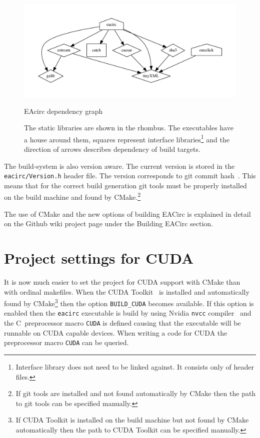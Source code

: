 \documentclass[12pt,twoside]{fithesis2}
\begin{document}
\begin{figure}[h]
	\begin{center}
		\includegraphics[width=.8\textwidth]{figures/deps}
	\end{center}
	\caption{EAcirc dependency graph}
	\label{fig:deps}
	\caption*{The static libraries are shown in the rhombus. The executables have a house around them, squares represent interface libraries\footnote{Interface library does not need to be linked against. It consists only of header files.} and the direction of arrows describes dependency of build targets.}
\end{figure}

The build-system is also version aware. The current version is stored in the \texttt{eacirc/Version.h} header file. The version corresponds to git commit hash~\cite{git_book}. This means that for the correct build generation git tools must be properly installed on the build machine and found by CMake.\footnote{If git tools are installed and not found automatically by CMake then the path to git tools can be specified manually.}

The use of CMake and the new options of building EACirc is explained in detail on the Github wiki project page under the Building EACirc section.

\section{Project settings for CUDA}

It is now much easier to set the project for CUDA support with CMake than with ordinal makefiles. When the CUDA Toolkit~\cite{cuda_toolkit} is installed and automatically found by CMake\footnote{If CUDA Toolkit is installed on the build machine but not found by CMake automatically then the path to CUDA Toolkit can be specified manually.} then the option \texttt{BUILD\_CUDA} becomes available. If this option is enabled then the \texttt{eacirc} executable is build by using Nvidia \texttt{nvcc} compiler~\cite{cuda_compiler} and the C~preprocessor macro \texttt{CUDA} is defined causing that the executable will be runnable on CUDA capable devices. When writing a code for CUDA the preprocessor macro \texttt{CUDA} can be queried.
\end{document}
